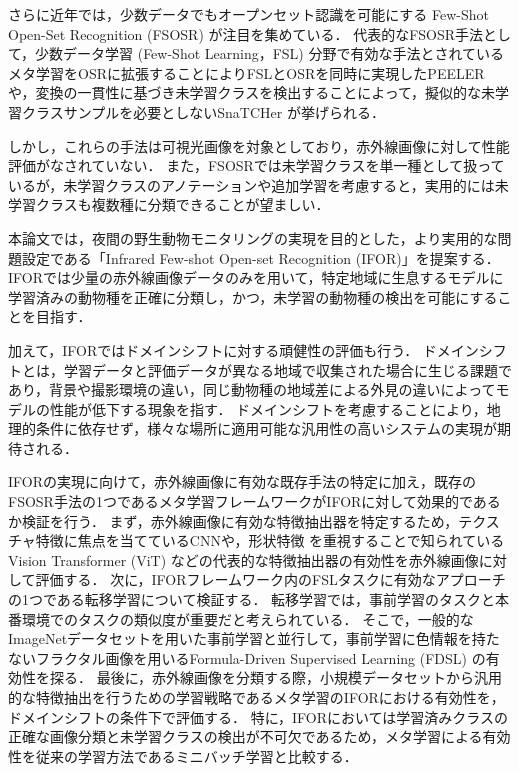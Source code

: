 \documentclass[a4paper,11pt,nomag]{jsreport}
\begin{document}
さらに近年では，少数データでもオープンセット認識を可能にする Few-Shot Open-Set Recognition (FSOSR) \cite{peeler} が注目を集めている．
代表的なFSOSR手法として，少数データ学習 (Few-Shot Learning，FSL) 分野で有効な手法とされているメタ学習をOSRに拡張することによりFSLとOSRを同時に実現したPEELER \cite{peeler}や，変換の一貫性に基づき未学習クラスを検出することによって，擬似的な未学習クラスサンプルを必要としないSnaTCHer \cite{snatcher}が挙げられる．

しかし，これらの手法は可視光画像を対象としており，赤外線画像に対して性能評価がなされていない．
また，FSOSRでは未学習クラスを単一種として扱っているが，未学習クラスのアノテーションや追加学習を考慮すると，実用的には未学習クラスも複数種に分類できることが望ましい．

本論文では，夜間の野生動物モニタリングの実現を目的とした，より実用的な問題設定である「Infrared Few-shot Open-set Recognition (IFOR)」を提案する．
IFORでは少量の赤外線画像データのみを用いて，特定地域に生息するモデルに学習済みの動物種を正確に分類し，かつ，未学習の動物種の検出を可能にすることを目指す．

加えて，IFORではドメインシフトに対する頑健性の評価も行う．
ドメインシフトとは，学習データと評価データが異なる地域で収集された場合に生じる課題であり，背景や撮影環境の違い，同じ動物種の地域差による外見の違いによってモデルの性能が低下する現象を指す．
ドメインシフトを考慮することにより，地理的条件に依存せず，様々な場所に適用可能な汎用性の高いシステムの実現が期待される．

IFORの実現に向けて，赤外線画像に有効な既存手法の特定に加え，既存のFSOSR手法の1つであるメタ学習フレームワークがIFORに対して効果的であるか検証を行う．
まず，赤外線画像に有効な特徴抽出器を特定するため，テクスチャ特徴に焦点を当てているCNNや，形状特徴 \cite{feature}を重視することで知られている Vision Transformer (ViT) \cite{vit}などの代表的な特徴抽出器の有効性を赤外線画像に対して評価する．
次に，IFORフレームワーク内のFSLタスクに有効なアプローチの1つである転移学習について検証する．
転移学習では，事前学習のタスクと本番環境でのタスクの類似度が重要だと考えられている．
そこで，一般的なImageNetデータセットを用いた事前学習と並行して，事前学習に色情報を持たないフラクタル画像を用いるFormula-Driven Supervised Learning (FDSL) \cite{fdsl}の有効性を探る．
最後に，赤外線画像を分類する際，小規模データセットから汎用的な特徴抽出を行うための学習戦略であるメタ学習のIFORにおける有効性を，ドメインシフトの条件下で評価する．
特に，IFORにおいては学習済みクラスの正確な画像分類と未学習クラスの検出が不可欠であるため，メタ学習による有効性を従来の学習方法であるミニバッチ学習と比較する．
\end{document}
